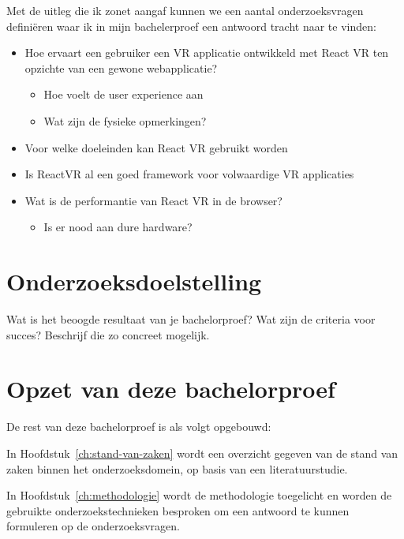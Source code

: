 Met de uitleg die ik zonet aangaf kunnen we een aantal onderzoeksvragen definiëren waar ik in mijn bachelerproef een antwoord tracht naar te vinden:
\begin{itemize}
  \item	Hoe ervaart een gebruiker een VR applicatie ontwikkeld met React VR ten opzichte van een gewone webapplicatie?
  \begin{itemize}
  \item	Hoe voelt de user experience aan
  \item	Wat zijn de fysieke opmerkingen?
  \end{itemize}
  \item	Voor welke doeleinden kan React VR gebruikt worden
  \item	Is ReactVR al een goed framework voor volwaardige VR applicaties
  \item	Wat is de performantie van React VR in de browser?
  \begin{itemize}
  \item Is er nood aan dure hardware?
  \end{itemize}
\end{itemize}



\section{Onderzoeksdoelstelling}
\label{sec:onderzoeksdoelstelling}

Wat is het beoogde resultaat van je bachelorproef? Wat zijn de criteria voor succes? Beschrijf die zo concreet mogelijk.

\section{Opzet van deze bachelorproef}
\label{sec:opzet-bachelorproef}


De rest van deze bachelorproef is als volgt opgebouwd:

In Hoofdstuk~\ref{ch:stand-van-zaken} wordt een overzicht gegeven van de stand van zaken binnen het onderzoeksdomein, op basis van een literatuurstudie.

In Hoofdstuk~\ref{ch:methodologie} wordt de methodologie toegelicht en worden de gebruikte onderzoekstechnieken besproken om een antwoord te kunnen formuleren op de onderzoeksvragen.


